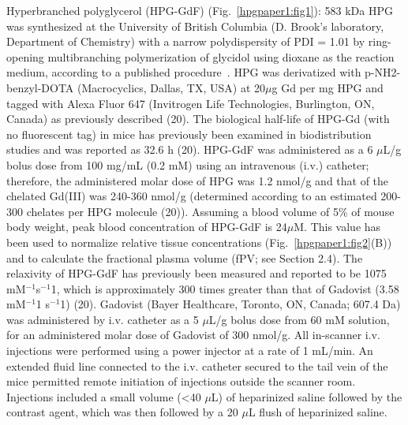 Hyperbranched polyglycerol (HPG-GdF) (Fig.~\ref{hpgpaper1:fig1}): 583 kDa HPG was synthesized at the University of British Columbia (D. Brook’s laboratory, Department of Chemistry) with a narrow polydispersity of PDI = 1.01 by ring-opening multibranching polymerization of glycidol using dioxane as the reaction medium, according to a published procedure~\cite{Kainthan:2006ce}.
HPG was derivatized with p-NH2-benzyl-DOTA (Macrocyclics, Dallas, TX, USA) at 20$\mu$g Gd per mg HPG and tagged with Alexa Fluor 647 (Invitrogen Life Technologies, Burlington, ON, Canada) as previously described (20).
The biological half-life of HPG-Gd (with no fluorescent tag) in mice has previously been examined in biodistribution studies and was reported as 32.6 h (20).
HPG-GdF was administered as a 6 $\mu$L/g bolus dose from 100 mg/mL (0.2 mM) using an intravenous (i.v.) catheter; therefore, the administered molar dose of HPG was 1.2 nmol/g and that of the chelated Gd(III) was 240-360 nmol/g (determined according to an estimated 200-300 chelates per HPG molecule (20)).
Assuming a blood volume of 5\% of mouse body weight, peak blood concentration of HPG-GdF is 24$\mu$M.
This value has been used to normalize relative tissue concentrations (Fig.~\ref{hpgpaper1:fig2}(B)) and to calculate the fractional plasma volume (fPV; see Section 2.4).
The relaxivity of HPG-GdF has previously been measured and reported to be 1075 mM$^{-1}$s$^{-1}$1, which is approximately 300 times greater than that of Gadovist (3.58 mM$^{-1}$1 s$^{-1}$1) (20).
Gadovist (Bayer Healthcare, Toronto, ON, Canada; 607.4 Da) was administered by i.v. catheter as a 5 $\mu$L/g bolus dose from 60 mM solution, for an administered molar dose of Gadovist of 300 nmol/g.
All in-scanner i.v. injections were performed using a power injector at a rate of 1 mL/min.
An extended fluid line connected to the i.v. catheter secured to the tail vein of the mice permitted remote initiation of injections outside the scanner room.
Injections included a small volume (<40 $\mu$L) of heparinized saline followed by the contrast agent, which was then followed by a 20 $\mu$L flush of heparinized saline.

